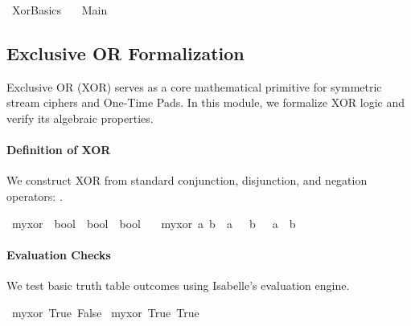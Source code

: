 %
\begin{isabellebody}%
%
%
\isadelimtheory
%
\endisadelimtheory
%
\isatagtheory
{}\isamarkupfalse%
\ Xor{\isacharunderscore}{\kern0pt}Basics\isanewline
\ \ \ Main\isanewline
{}%
\endisatagtheory
{\isafoldtheory}%
%
\isadelimtheory
%
\endisadelimtheory
%
\isadelimdocument
%
\endisadelimdocument
%
\isatagdocument
%
\isamarkuptrue%
%
\endisatagdocument
{\isafolddocument}%
%
\isadelimdocument
%
\endisadelimdocument
%
\begin{isamarkuptext}%
\subsection{Exclusive OR Formalization}
  Exclusive OR (XOR) serves as a core mathematical primitive for symmetric stream ciphers and One-Time Pads.
  In this module, we formalize XOR logic and verify its algebraic properties.%
\end{isamarkuptext}\isamarkuptrue%
%
\begin{isamarkuptext}%
\paragraph{Definition of XOR}
  We construct XOR from standard conjunction, disjunction, and negation operators: .%
\end{isamarkuptext}\isamarkuptrue%
\isamarkupfalse%
\ my{\isacharunderscore}{\kern0pt}xor\ {\isacharcolon}{\kern0pt}{\isacharcolon}{\kern0pt}\ {\isachardoublequoteopen}bool\ {\isasymRightarrow}\ bool\ {\isasymRightarrow}\ bool{\isachardoublequoteclose}\ \isanewline
\ \ {\isachardoublequoteopen}my{\isacharunderscore}{\kern0pt}xor\ a\ b\ {\isasymequiv}\ {\isacharparenleft}{\kern0pt}a\ {\isasymand}\ {\isasymnot}\ b{\isacharparenright}{\kern0pt}\ {\isasymor}\ {\isacharparenleft}{\kern0pt}{\isasymnot}\ a\ {\isasymand}\ b{\isacharparenright}{\kern0pt}{\isachardoublequoteclose}%
\begin{isamarkuptext}%
\paragraph{Evaluation Checks}
  We test basic truth table outcomes using Isabelle's evaluation engine.%
\end{isamarkuptext}\isamarkuptrue%
\isamarkupfalse%
\ {\isachardoublequoteopen}my{\isacharunderscore}{\kern0pt}xor\ True\ False{\isachardoublequoteclose}\isanewline
{}\isamarkupfalse%
\ {\isachardoublequoteopen}my{\isacharunderscore}{\kern0pt}xor\ True\ True{\isachardoublequoteclose}%
\begin{isamarkuptext}%

\end{isamarkuptext}
\end{isabellebody}
